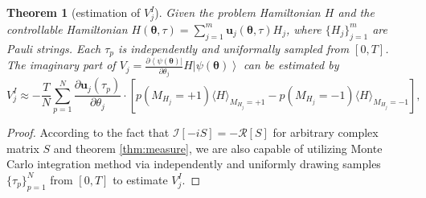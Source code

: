 \documentclass[twocolumn,
pra,aps,superscriptaddress,showpacs,amsmath,amssymb]{revtex4-2}
\newtheorem{theorem}{Theorem}
\begin{document}
\begin{theorem}[estimation of $V_{j}^I$]\label{thm:V_I}
Given the problem Hamiltonian $H$ and the controllable Hamiltonian $H(\bm{\theta}, \tau)=\sum_{j=1}^m \bm{u}_j(\bm{\theta},\tau)H_j$, where $\{H_j\}_{j=1}^m$ are Pauli strings. Each $\tau_p$ is independently and  uniformally sampled from $[0,T]$. The imaginary part of $V_{j}=\frac{\partial\left\langle\psi(\bm{\theta})\right|}{\partial\theta_{j}}H\left|\psi(\bm{\theta})\right\rangle$ can be estimated by
\begin{equation}
V_{j}^I \approx -\frac{T}{N}\sum_{p=1}^N \frac{\partial{\bm{u}_j}(\tau_p)}{\partial{\theta_j}} \cdot \left[p(M_{H_j}=+1)\langle H \rangle_{M_{H_j}=+1}-p(M_{H_j}=-1)\langle H \rangle_{M_{H_j}=-1}\right], 
\end{equation}

\end{theorem}

\begin{proof}
According to the fact that $\mathcal{I}[-i S] = - \mathcal{R}[S]$ for arbitrary complex matrix $S$ and theorem \ref{thm:measure}, we are also capable of utilizing Monte Carlo integration method via independently and uniformly drawing samples $\{\tau_p\}_{p=1}^N$ from $[0,T]$ to estimate $V_j^I$.
\end{proof}
\end{document}
